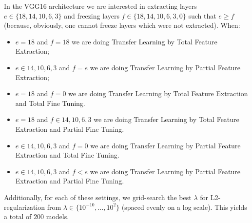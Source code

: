 In the VGG16 architecture we are interested in extracting layers $e \in \{18,14,10,6,3\}$ and freezing layers $f \in \{18,14,10,6,3,0\}$ such that $e \geq f$ (because, obviously, one cannot freeze layers which were not extracted). When:


\begin{itemize}
    \item $e = 18$ and $f = 18$ we are doing Transfer Learning by Total Feature Extraction;
    \item $e \in {14,10,6,3}$ and $f = e$ we are doing Transfer Learning by Partial Feature Extraction;

    \item $e = 18$ and $f = 0$ we are doing Transfer Learning by Total Feature Extraction and Total Fine Tuning.
    \item $e = 18$ and $f \in {14,10,6,3}$ we are doing Transfer Learning by Total Feature Extraction and Partial Fine Tuning.

    \item $e \in {14,10,6,3}$ and $f = 0$ we are doing Transfer Learning by Partial Feature Extraction and Total Fine Tuning.
    \item $e \in {14,10,6,3}$ and $f < e$ we are doing Transfer Learning by Partial Feature Extraction and Partial Fine Tuning.
\end{itemize}

Additionally, for each of these settings, we grid-search the best $\lambda$ for L2-regularization from $\lambda \in \{10^{-10}, ..., 10^{2}\}$ (spaced evenly on a log scale). This yields a total of $200$ models.



